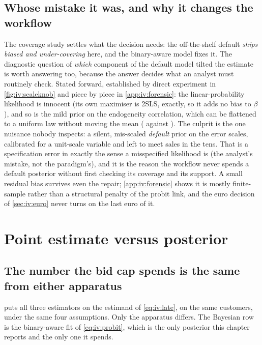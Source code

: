 \subsection*{Whose mistake it was, and why it changes the workflow}

The coverage study settles what the decision needs: the off-the-shelf default \emph{ships biased and
under-covering} here, and the binary-aware model fixes it. The diagnostic question of \emph{which}
component of the default model tilted the estimate is worth answering too, because the answer decides
what an analyst must routinely check. Stated forward, established by direct experiment in
\cref{fig:iv:scaleknob} and piece by piece in \cref{app:iv:forensic}: the linear-probability
likelihood is innocent (its own maximiser is 2SLS,
exactly, so it adds no bias to $\beta$), and so is the mild prior on the endogeneity correlation,
which can be flattened to a uniform law without moving the mean (\eur{\nbElevenGaussFlatMean} against
\eur{\nbElevenGaussMean}). The culprit is the one nuisance nobody inspects: a silent, mis-scaled
\emph{default} prior on the error scales, calibrated for a unit-scale variable and left to meet sales
in the tens. That is a specification error in exactly the sense a misspecified likelihood is (the
analyst's mistake, not the paradigm's), and it is the reason the workflow never spends a default
posterior without first checking its coverage and its support. A small residual bias survives even
the repair; \cref{app:iv:forensic} shows it is mostly finite-sample rather than a structural penalty
of the probit link, and the euro decision of \cref{sec:iv:euro} never turns on the last euro of it.

\section{Point estimate versus posterior}
\label{sec:iv:compare}



\subsection*{The number the bid cap spends is the same from either apparatus}

 puts all three estimators on the estimand of \cref{eq:iv:late}, on the same
\nbElevenN{} customers, under the same four assumptions. Only the apparatus differs. The Bayesian row
is the binary-aware fit of \cref{eq:iv:probit}, which is the only posterior this chapter reports and
the only one it spends.

